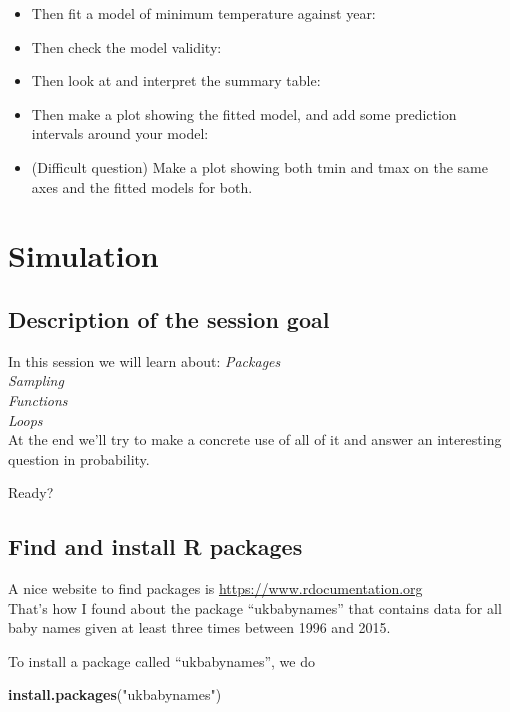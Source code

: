 \documentclass[]{book}
\newenvironment{Shaded}{\begin{snugshade}}{\end{snugshade}}
\newcommand{\KeywordTok}[1]{\textcolor[rgb]{0.13,0.29,0.53}{\textbf{#1}}}
\newcommand{\NormalTok}[1]{#1}
\newcommand{\StringTok}[1]{\textcolor[rgb]{0.31,0.60,0.02}{#1}}
\begin{document}
\begin{itemize}
\item
  Then fit a model of minimum temperature against year:
\item
  Then check the model validity:
\item
  Then look at and interpret the summary table:
\item
  Then make a plot showing the fitted model, and add some prediction intervals around your model:
\item
  (Difficult question) Make a plot showing both tmin and tmax on the same axes and the fitted models for both.
\end{itemize}

\hypertarget{simulation}{%
\chapter{Simulation}\label{simulation}}

\hypertarget{description-of-the-session-goal}{%
\section{Description of the session goal}\label{description-of-the-session-goal}}

In this session we will learn about:
\emph{Packages}\\
\emph{Sampling}\\
\emph{Functions}\\
\emph{Loops}\\
At the end we'll try to make a concrete use of all of it and answer an interesting question in probability.

Ready?

\hypertarget{find-and-install-r-packages}{%
\section{Find and install R packages}\label{find-and-install-r-packages}}

A nice website to find packages is \url{https://www.rdocumentation.org}\\
That's how I found about the package ``ukbabynames'' that contains data for all baby names given at least three times between 1996 and 2015.

To install a package called ``ukbabynames'', we do

\begin{Shaded}
\begin{Highlighting}[]
\KeywordTok{install.packages}\NormalTok{(}\StringTok{"ukbabynames"}\NormalTok{)}
\end{Highlighting}
\end{Shaded}
\end{document}
